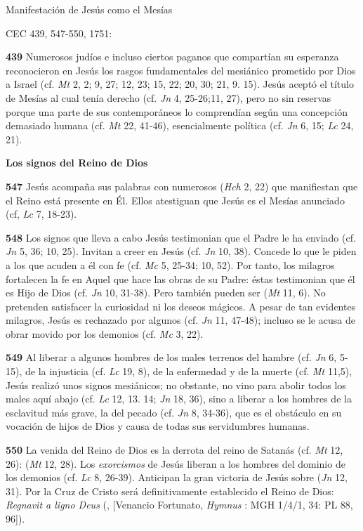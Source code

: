 Manifestación de Jesús como el Mesías

CEC 439, 547-550, 1751:

\textbf{439} Numerosos judíos e incluso ciertos paganos que compartían su esperanza reconocieron en Jesús los rasgos fundamentales del mesiánico  prometido por Dios a Israel (cf. \emph{Mt} 2, 2; 9, 27; 12, 23; 15, 22; 20, 30; 21, 9. 15). Jesús aceptó el título de Mesías al cual tenía derecho (cf. \emph{Jn} 4, 25-26;11, 27), pero no sin reservas porque una parte de sus contemporáneos lo comprendían según una concepción demasiado humana (cf. \emph{Mt} 22, 41-46), esencialmente política (cf. \emph{Jn} 6, 15; \emph{Lc} 24, 21).

\textbf{Los signos del Reino de Dios}

\textbf{547} Jesús acompaña sus palabras con numerosos  (\emph{Hch} 2, 22) que manifiestan que el Reino está presente en Él. Ellos atestiguan que Jesús es el Mesías anunciado (cf, \emph{Lc} 7, 18-23).

\textbf{548} Los signos que lleva a cabo Jesús testimonian que el Padre le ha enviado (cf. \emph{Jn} 5, 36; 10, 25). Invitan a creer en Jesús (cf. \emph{Jn} 10, 38). Concede lo que le piden a los que acuden a él con fe (cf. \emph{Mc} 5, 25-34; 10, 52). Por tanto, los milagros fortalecen la fe en Aquel que hace las obras de su Padre: éstas testimonian que él es Hijo de Dios (cf. \emph{Jn} 10, 31-38). Pero también pueden ser  (\emph{Mt} 11, 6). No pretenden satisfacer la curiosidad ni los deseos mágicos. A pesar de tan evidentes milagros, Jesús es rechazado por algunos (cf. \emph{Jn} 11, 47-48); incluso se le acusa de obrar movido por los demonios (cf. \emph{Mc} 3, 22).

\textbf{549} Al liberar a algunos hombres de los males terrenos del hambre (cf. \emph{Jn} 6, 5-15), de la injusticia (cf. \emph{Lc} 19, 8), de la enfermedad y de la muerte (cf. \emph{Mt} 11,5), Jesús realizó unos signos mesiánicos; no obstante, no vino para abolir todos los males aquí abajo (cf. \emph{Lc} 12, 13. 14; \emph{Jn} 18, 36), sino a liberar a los hombres de la esclavitud más grave, la del pecado (cf. \emph{Jn} 8, 34-36), que es el obstáculo en su vocación de hijos de Dios y causa de todas sus servidumbres humanas.

\textbf{550} La venida del Reino de Dios es la derrota del reino de Satanás (cf. \emph{Mt} 12, 26):  (\emph{Mt} 12, 28). Los \emph{exorcismos} de Jesús liberan a los hombres del dominio de los demonios (cf. \emph{Lc} 8, 26-39). Anticipan la gran victoria de Jesús sobre  (\emph{Jn} 12, 31). Por la Cruz de Cristo será definitivamente establecido el Reino de Dios: \emph{Regnavit a ligno Deus} (, {[}Venancio Fortunato, \emph{Hymnus }: MGH 1/4/1, 34: PL 88, 96{]}).

